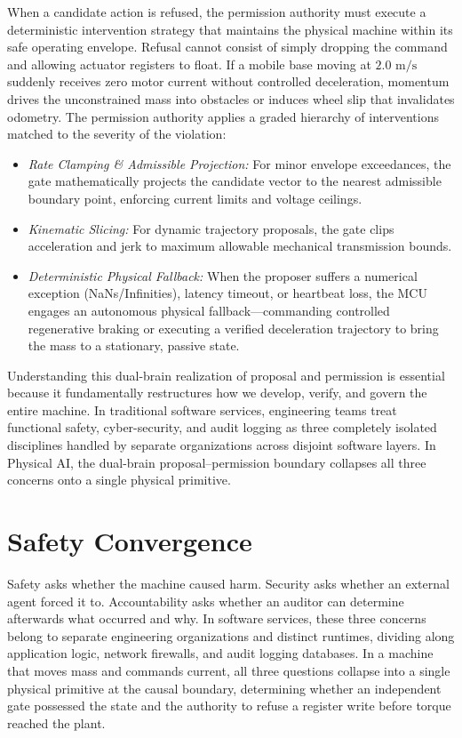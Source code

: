 \documentclass[
  10pt,
  letterpaper,
  twoside,
  openright,
  numbers=noenddot,
  headings=standardclasses
]{scrbook}
\begin{document}
When a candidate action is refused, the permission authority must
execute a deterministic intervention strategy that maintains the
physical machine within its safe operating envelope. Refusal cannot
consist of simply dropping the command and allowing actuator registers
to float. If a mobile base moving at \(2.0\text{ m/s}\) suddenly
receives zero motor current without controlled deceleration, momentum
drives the unconstrained mass into obstacles or induces wheel slip that
invalidates odometry. The permission authority applies a graded
hierarchy of interventions matched to the severity of the violation:

\begin{itemize}
\tightlist
\item
  \emph{Rate Clamping \& Admissible Projection:} For minor envelope
  exceedances, the gate mathematically projects the candidate vector to
  the nearest admissible boundary point, enforcing current limits and
  voltage ceilings.
\item
  \emph{Kinematic Slicing:} For dynamic trajectory proposals, the gate
  clips acceleration and jerk to maximum allowable mechanical
  transmission bounds.
\item
  \emph{Deterministic Physical Fallback:} When the proposer suffers a
  numerical exception (NaNs/Infinities), latency timeout, or heartbeat
  loss, the MCU engages an autonomous physical fallback---commanding
  controlled regenerative braking or executing a verified deceleration
  trajectory to bring the mass to a stationary, passive state.
\end{itemize}

Understanding this dual-brain realization of proposal and permission is
essential because it fundamentally restructures how we develop, verify,
and govern the entire machine. In traditional software services,
engineering teams treat functional safety, cyber-security, and audit
logging as three completely isolated disciplines handled by separate
organizations across disjoint software layers. In Physical AI, the
dual-brain proposal--permission boundary collapses all three concerns
onto a single physical primitive.

\section{Safety Convergence}\label{sec-boundary-1-9}

Safety asks whether the machine caused harm. Security asks whether an
external agent forced it to. Accountability asks whether an auditor can
determine afterwards what occurred and why. In software services, these
three concerns belong to separate engineering organizations and distinct
runtimes, dividing along application logic, network firewalls, and audit
logging databases. In a machine that moves mass and commands current,
all three questions collapse into a single physical primitive at the
causal boundary, determining whether an independent gate possessed the
state and the authority to refuse a register write before torque reached
the plant.
\end{document}
